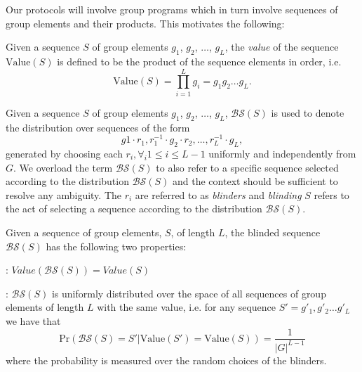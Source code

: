 Our  protocols  will involve  group  programs  which  in turn  involve
sequences  of group elements  and their  products. This  motivates the
following:

\begin{definition}
Given a sequence $S$ of  group elements $g_1$, $g_2$, $\ldots$, $g_L$,
the {\em value} of the sequence $\mbox{Value}(S)$ is defined to be the
product of the sequence elements in order, i.e.
\[ \mbox{Value}(S) = \prod_{i=1}^L g_i = g_1g_2\ldots g_L. \]
\end{definition}

\begin{definition}[Blinding]
Given a sequence $S$ of  group elements $g_1$, $g_2$, $\ldots$, $g_L$,
$\mathcal{BS}(S)$ is used to denote the distribution over sequences of
the form
\[ g1\cdot r_1, r_1^{-1}\cdot g_2\cdot r_2,\ldots,  r_L^{-1}\cdot g_L, \] 
generated by choosing each $r_i, \forall_i 1\leq i \leq L-1$ uniformly
and independently from $G$.  We overload the term $\mathcal{BS}(S)$ to
also  refer   to  a  specific  sequence  selected   according  to  the
distribution $\mathcal{BS}(S)$ and the context should be sufficient to
resolve any  ambiguity.  The $r_i$  are referred to as  {\em blinders}
and  {\em blinding}  $S$ refers  to the  act of  selecting  a sequence
according to the distribution $\mathcal{BS}(S)$.
\end{definition}

\begin{lemma}
\label{lemma:blindinglemma}
Given a  sequence of group elements,  $S$, of length  $L$, the blinded
sequence $\mathcal{BS}(S)$ has the following two properties:

:  $Value(\mathcal{BS}(S)) = Value(S)$

:  $\mathcal{BS}(S)$  is uniformly
distributed  over the  space of  all  sequences of  group elements  of
length $L$  with the  same value,  i.e. for any  sequence $S'  = g'_1,
g'_2\ldots g'_L$ we have that
\[ \mbox{Pr}(\mathcal{BS}(S) = S'| \mbox{Value}(S') = \mbox{Value}(S)) = \frac{1}{|G|^{L-1}} \] 
where  the probability  is measured  over  the random  choices of  the
blinders.
\end{lemma}

